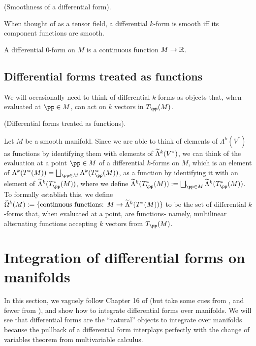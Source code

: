 \begin{theorem}
      (Smoothness of a differential form).
    
    When thought of as a tensor field, a differential $k$-form is smooth iff its component functions are smooth.
\end{theorem}

\begin{remark}
    A differential 0-form on $M$ is a continuous function $M \rightarrow \mathbb{R}$.
\end{remark}

\subsection*{Differential forms treated as functions}

We will occasionally need to think of differential $k$-forms as objects that, when evaluated at $\pp \in M$, can act on $k$ vectors in $T_\pp(M)$.

\begin{deriv}
\label{ch::diff_forms::deriv::diff_forms_actual_fns}
    (Differential forms treated as functions).
    
    Let $M$ be a smooth manifold. Since we are able to think of elements of $\Lambda^k(V^*)$ as functions by identifying them with elements of $\widetilde{\Lambda}^k(V^*)$, we can think of the evaluation at a point $\pp \in M$ of a differential $k$-forms on $M$, which is an element of $\Lambda^k(T^*(M)) = \bigsqcup_{\pp \in M} \Lambda^k(T_\pp^*(M))$, as a function by identifying it with an element of $\tLambda^k(T_\pp^*(M))$, where we define ${\tLambda^k(T_\pp^*(M)) := \bigsqcup_{\pp \in M} \tLambda^k(T_\pp^*(M))}$. To formally establish this, we define ${\widetilde{\Omega}^k(M) := \{ \text{continuous functions: $M \rightarrow \widetilde{\Lambda}^k(T^*(M))$} \}}$ to be the set of differential $k$-forms that, when evaluated at a point, are functions- namely, multilinear alternating functions accepting $k$ vectors from $T_\pp(M)$.
\end{deriv}

\newpage

\section{Integration of differential forms on manifolds}

In this section, we vaguely follow Chapter 16 of \cite{book::SM} (but take some cues from \cite{book::Hubbard}, and fewer from \cite{book::DiffTop}), and show how to integrate differential forms over manifolds. We will see that differential forms are the ``natural'' objects to integrate over manifolds because the pullback of a differential form interplays perfectly with the change of variables theorem from multivariable calculus.

